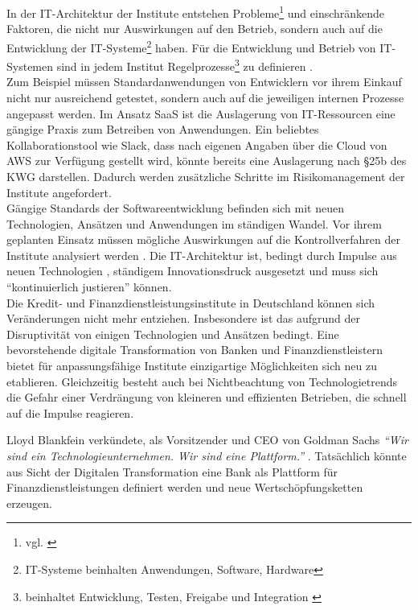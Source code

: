 In der IT-Architektur der Institute entstehen Probleme\footnote{vgl. \cite{mci/Disterer2011}} und einschränkende Faktoren, die nicht nur Auswirkungen auf den Betrieb, sondern auch auf die Entwicklung der IT-Systeme\footnote{IT-Systeme beinhalten Anwendungen, Software, Hardware} haben. Für die Entwicklung und Betrieb von IT-Systemen sind in jedem Institut Regelprozesse\footnote{beinhaltet Entwicklung, Testen, Freigabe und Integration \cite{MaRisk:2017}} zu definieren \cite{MaRisk:2017}. 
\medskip
\\
Zum Beispiel müssen Standardanwendungen von Entwicklern vor ihrem Einkauf nicht nur ausreichend getestet, sondern auch auf die jeweiligen internen Prozesse angepasst werden. Im Ansatz \ac{SaaS} ist die Auslagerung von IT-Ressourcen eine gängige Praxis zum Betreiben von Anwendungen. Ein beliebtes Kollaborationstool wie Slack, dass nach eigenen Angaben über die Cloud von \ac{AWS} zur Verfügung gestellt wird, könnte bereits eine Auslagerung nach §25b des \ac{KWG} darstellen. Dadurch werden zusätzliche Schritte im Risikomanagement der Institute angefordert.
\medskip
\\
Gängige Standards der Softwareentwicklung befinden sich mit neuen Technologien, Ansätzen und Anwendungen im ständigen Wandel. Vor ihrem geplanten Einsatz müssen mögliche Auswirkungen auf die Kontrollverfahren der Institute analysiert werden \cite{MaRisk:2017}.
Die IT-Architektur ist, bedingt durch Impulse aus neuen Technologien \cite{Bussmann2006}, ständigem Innovationsdruck ausgesetzt und muss sich \enquote{kontinuierlich justieren} \cite{Bussmann2006} können. 
\medskip
\\
Die Kredit- und Finanzdienstleistungsinstitute in Deutschland können sich Veränderungen nicht mehr entziehen. Insbesondere ist das aufgrund der Disruptivität von einigen Technologien und Ansätzen bedingt. Eine bevorstehende digitale Transformation von Banken und Finanzdienstleistern bietet für anpassungsfähige Institute einzigartige Möglichkeiten sich neu zu etablieren. Gleichzeitig besteht auch bei Nichtbeachtung von Technologietrends die Gefahr einer Verdrängung von kleineren und effizienten Betrieben, die schnell auf die Impulse reagieren.

Lloyd Blankfein verkündete, als Vorsitzender und \ac{CEO} von Goldman Sachs \emph{\enquote{Wir sind ein Technologieunternehmen. Wir sind eine Plattform.}} \cite{Gupta:2017}. Tatsächlich könnte aus Sicht der Digitalen Transformation eine Bank als Plattform für Finanzdienstleistungen definiert werden und neue Wertschöpfungsketten erzeugen. 
\medskip
\\
%
%
